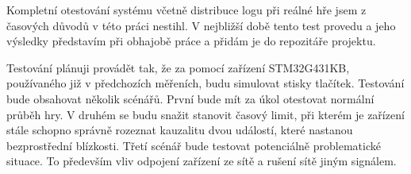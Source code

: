 {\sbf Kompletní otestování systému} včetně distribuce logu při reálné hře jsem z časových důvodů v této práci nestihl. V nejbližší době tento test provedu a jeho výsledky představím při obhajobě práce a přidám je do repozitáře projektu.

Testování plánuji provádět tak, že za pomocí zařízení STM32G431KB, používaného již v předchozích měřeních, budu simulovat stisky tlačítek. Testování bude obsahovat několik scénářů. První bude mít za úkol otestovat normální průběh hry. V druhém se budu snažit stanovit časový limit, při kterém je zařízení stále schopno správně rozeznat kauzalitu dvou událostí, které nastanou bezprostřední blízkosti. Třetí scénář bude testovat potenciálně problematické situace. To především vliv odpojení zařízení ze sítě a rušení sítě jiným signálem.

